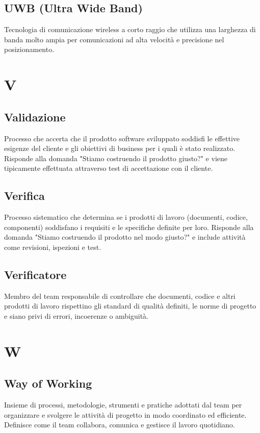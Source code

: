 \documentclass[a4paper,11pt]{article}
\begin{document}
\subsection{UWB (Ultra Wide Band)}
Tecnologia di comunicazione wireless a corto raggio che utilizza una larghezza di banda molto ampia per comunicazioni ad alta velocità e precisione nel posizionamento.

\newpage
\section{V}

\subsection{Validazione}
Processo che accerta che il prodotto software sviluppato soddisfi le effettive esigenze del cliente e gli obiettivi di business per i quali è stato realizzato. Risponde alla domanda "Stiamo costruendo il prodotto giusto?" e viene tipicamente effettuata attraverso test di accettazione con il cliente.

\subsection{Verifica}
Processo sistematico che determina se i prodotti di lavoro (documenti, codice, componenti) soddisfano i requisiti e le specifiche definite per loro. Risponde alla domanda "Stiamo costruendo il prodotto nel modo giusto?" e include attività come revisioni, ispezioni e test.

\subsection{Verificatore}
Membro del team responsabile di controllare che documenti, codice e altri prodotti di lavoro rispettino gli standard di qualità definiti, le norme di progetto e siano privi di errori, incoerenze o ambiguità.

\newpage
\section{W}

\subsection{Way of Working}
Insieme di processi, metodologie, strumenti e pratiche adottati dal team per organizzare e svolgere le attività di progetto in modo coordinato ed efficiente. Definisce come il team collabora, comunica e gestisce il lavoro quotidiano.
\end{document}
